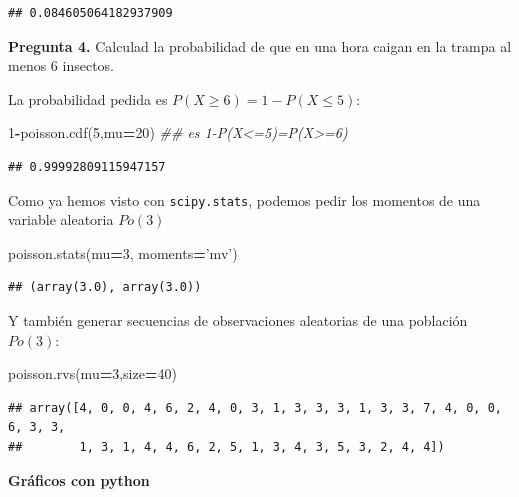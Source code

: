 \documentclass[]{book}
\newenvironment{Shaded}{\begin{snugshade}}{\end{snugshade}}
\newcommand{\CommentTok}[1]{\textcolor[rgb]{0.56,0.35,0.01}{\textit{#1}}}
\newcommand{\DecValTok}[1]{\textcolor[rgb]{0.00,0.00,0.81}{#1}}
\newcommand{\NormalTok}[1]{#1}
\newcommand{\OperatorTok}[1]{\textcolor[rgb]{0.81,0.36,0.00}{\textbf{#1}}}
\newcommand{\StringTok}[1]{\textcolor[rgb]{0.31,0.60,0.02}{#1}}
\begin{document}
\begin{verbatim}
## 0.084605064182937909
\end{verbatim}

\textbf{Pregunta 4.} Calculad la probabilidad de que en una hora caigan en la trampa al menos 6 insectos.

La probabilidad pedida es \(P(X\geq 6)=1-P(X\leq 5)\):

\begin{Shaded}
\begin{Highlighting}[]
\DecValTok{1}\OperatorTok{-}\NormalTok{poisson.cdf(}\DecValTok{5}\NormalTok{,mu}\OperatorTok{=}\DecValTok{20}\NormalTok{) }
\CommentTok{## es 1-P(X<=5)=P(X>=6)}
\end{Highlighting}
\end{Shaded}

\begin{verbatim}
## 0.99992809115947157
\end{verbatim}

Como ya hemos visto con \texttt{scipy.stats}, podemos pedir los momentos de una variable aleatoria
\(Po(3)\)

\begin{Shaded}
\begin{Highlighting}[]
\NormalTok{poisson.stats(mu}\OperatorTok{=}\DecValTok{3}\NormalTok{, moments}\OperatorTok{=}\StringTok{'mv'}\NormalTok{)}
\end{Highlighting}
\end{Shaded}

\begin{verbatim}
## (array(3.0), array(3.0))
\end{verbatim}

Y también generar secuencias de observaciones aleatorias de una población \(Po(3)\):

\begin{Shaded}
\begin{Highlighting}[]
\NormalTok{poisson.rvs(mu}\OperatorTok{=}\DecValTok{3}\NormalTok{,size}\OperatorTok{=}\DecValTok{40}\NormalTok{)}
\end{Highlighting}
\end{Shaded}

\begin{verbatim}
## array([4, 0, 0, 4, 6, 2, 4, 0, 3, 1, 3, 3, 3, 1, 3, 3, 7, 4, 0, 0, 6, 3, 3,
##        1, 3, 1, 4, 4, 6, 2, 5, 1, 3, 4, 3, 5, 3, 2, 4, 4])
\end{verbatim}

\textbf{Gráficos con python}
\end{document}

